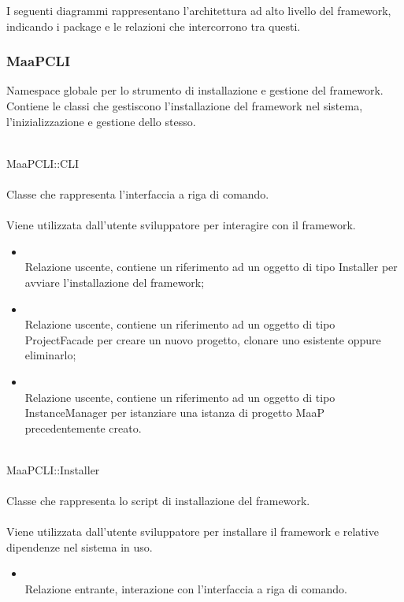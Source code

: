 I seguenti diagrammi rappresentano l'architettura ad alto livello del framework, indicando i package e le relazioni che intercorrono tra questi.

\subsubsection{MaaPCLI}
Namespace globale per lo strumento di installazione e gestione del framework. Contiene le classi che gestiscono l'installazione del framework nel sistema, l'inizializzazione e gestione dello stesso.


	\\
	MaaPCLI::CLI\\
	\\
	Classe che rappresenta l'interfaccia a riga di comando.\\
	\\
	Viene utilizzata dall'utente sviluppatore per interagire con il framework.\\
	\begin{itemize}
	\item{}\\
	Relazione uscente, contiene un riferimento ad un oggetto di tipo Installer per avviare l'installazione del framework;
	\item{}\\
	Relazione uscente, contiene un riferimento ad un oggetto di tipo ProjectFacade per creare un nuovo progetto, clonare uno esistente oppure eliminarlo;
	\item{}\\
	Relazione uscente, contiene un riferimento ad un oggetto di tipo InstanceManager per istanziare una istanza di progetto MaaP precedentemente creato.
	\end{itemize}
	
	\\
	MaaPCLI::Installer\\
	\\
	Classe che rappresenta lo script di installazione del framework.\\
	\\
	Viene utilizzata dall'utente sviluppatore per installare il framework e relative dipendenze nel sistema in uso.\\
	\begin{itemize}
	\item{}\\
	Relazione entrante, interazione con l'interfaccia a riga di comando.
	\end{itemize}
	
